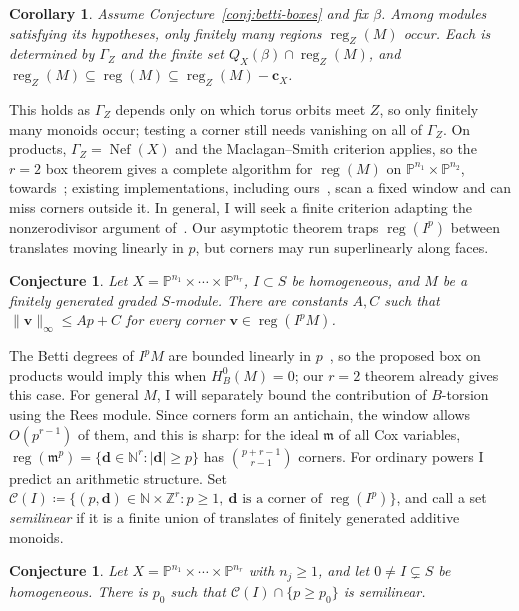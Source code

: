 \documentclass[11pt,reqno]{amsart}
\newtheorem{cor}[lemma]{Corollary}
\newtheorem{conjecture}[lemma]{Conjecture}
\theoremstyle{remark}
\newcommand{\reg}{\operatorname{reg}}
\newcommand{\Nef}{\operatorname{Nef}}
\newcommand{\dd}{\mathbf{d}}
\newcommand{\vv}{\mathbf{v}}
\newcommand{\NN}{\mathbb{N}}
\newcommand{\PP}{\mathbb{P}}
\newcommand{\ZZ}{\mathbb{Z}}
\newcommand{\cC}{\mathcal{C}}
\begin{document}
\begin{cor}\label{cor:finite-regularity-test}
Assume Conjecture~\ref{conj:betti-boxes} and fix $\beta$. Among modules satisfying its hypotheses, only finitely many regions $\reg_Z(M)$ occur. Each is determined by $\Gamma_Z$ and the finite set $Q_X(\beta)\cap\reg_Z(M)$, and $\reg_Z(M)\subseteq\reg(M)\subseteq\reg_Z(M)-\mathbf c_X$.
\end{cor}

This holds as $\Gamma_Z$ depends only on which torus orbits meet $Z$, so only finitely many monoids occur; testing a corner still needs vanishing on all of $\Gamma_Z$. On products, $\Gamma_Z=\Nef(X)$ and the Maclagan--Smith criterion applies, so the $r=2$ box theorem gives a complete algorithm for $\reg(M)$ on $\PP^{n_1}\times\PP^{n_2}$, towards~\cite[Prob.~4.10]{maclaganSmith04}; existing implementations, including ours~\cite{ABLS20}, scan a fixed window and can miss corners outside it. In general, I will seek a finite criterion adapting the nonzerodivisor argument of~\cite[Cor.~4.8]{maclaganSmith04}. Our asymptotic theorem traps $\reg(I^p)$ between translates moving linearly in $p$, but corners may run superlinearly along faces.

\begin{conjecture}\label{conj:linear-windows-powers}
Let $X=\PP^{n_1}\times\cdots\times\PP^{n_r}$, $I\subset S$ be homogeneous, and $M$ be a finitely generated graded $S$-module. There are constants $A,C$ such that $\|\vv\|_\infty\le Ap+C$ for every corner $\vv\in\reg(I^pM)$.
\end{conjecture}

The Betti degrees of $I^pM$ are bounded linearly in $p$~\cite[Thm.~1.1]{BCHT13}, so the proposed box on products would imply this when $H_B^0(M)=0$; our $r=2$ theorem already gives this case. For general $M$, I will separately bound the contribution of $B$-torsion using the Rees module. Since corners form an antichain, the window allows $O(p^{r-1})$ of them, and this is sharp: for the ideal $\mathfrak m$ of all Cox variables, $\reg(\mathfrak m^p)=\{\dd\in\NN^r:|\dd|\ge p\}$ has $\binom{p+r-1}{r-1}$ corners. For ordinary powers I predict an arithmetic structure. Set $\cC(I)\coloneqq\{(p,\dd)\in\NN\times\ZZ^r : p\geq1,\ \dd\text{ is a corner of }\reg(I^p)\}$, and call a set \emph{semilinear} if it is a finite union of translates of finitely generated additive monoids.

\begin{conjecture}\label{conj:semilinear-corners}
Let $X=\PP^{n_1}\times\cdots\times\PP^{n_r}$ with $n_j\geq1$, and let $0\neq I\subsetneq S$ be homogeneous. There is $p_0$ such that $\cC(I)\cap\{p\geq p_0\}$ is semilinear.
\end{conjecture}
\end{document}
